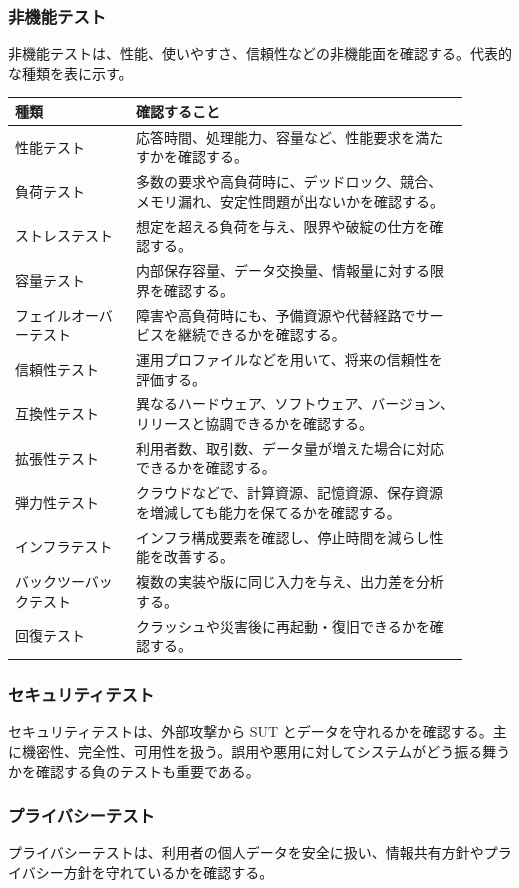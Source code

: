 \documentclass[uplatex,dvipdfmx,a4paper,11pt,nomag]{jsarticle}
\begin{document}
\subsubsection{非機能テスト}
非機能テストは、性能、使いやすさ、信頼性などの非機能面を確認する。代表的な種類を表に示す。

\begin{longtable}{P{0.24\linewidth}P{0.66\linewidth}}
\toprule
\textbf{種類} & \textbf{確認すること} \\
\midrule
性能テスト & 応答時間、処理能力、容量など、性能要求を満たすかを確認する。\\
負荷テスト & 多数の要求や高負荷時に、デッドロック、競合、メモリ漏れ、安定性問題が出ないかを確認する。\\
ストレステスト & 想定を超える負荷を与え、限界や破綻の仕方を確認する。\\
容量テスト & 内部保存容量、データ交換量、情報量に対する限界を確認する。\\
フェイルオーバーテスト & 障害や高負荷時にも、予備資源や代替経路でサービスを継続できるかを確認する。\\
信頼性テスト & 運用プロファイルなどを用いて、将来の信頼性を評価する。\\
互換性テスト & 異なるハードウェア、ソフトウェア、バージョン、リリースと協調できるかを確認する。\\
拡張性テスト & 利用者数、取引数、データ量が増えた場合に対応できるかを確認する。\\
弾力性テスト & クラウドなどで、計算資源、記憶資源、保存資源を増減しても能力を保てるかを確認する。\\
インフラテスト & インフラ構成要素を確認し、停止時間を減らし性能を改善する。\\
バックツーバックテスト & 複数の実装や版に同じ入力を与え、出力差を分析する。\\
回復テスト & クラッシュや災害後に再起動・復旧できるかを確認する。\\
\bottomrule
\end{longtable}

\subsubsection{セキュリティテスト}
セキュリティテストは、外部攻撃から SUT とデータを守れるかを確認する。主に機密性、完全性、可用性を扱う。誤用や悪用に対してシステムがどう振る舞うかを確認する負のテストも重要である。

\subsubsection{プライバシーテスト}
プライバシーテストは、利用者の個人データを安全に扱い、情報共有方針やプライバシー方針を守れているかを確認する。
\end{document}
